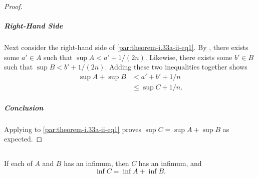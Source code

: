 \documentclass{report}
\begin{document}
\begin{proof}
    \subparagraph{Right-Hand Side}%

      Next consider the right-hand side of \eqref{par:theorem-i.33a-ii-eq1}.
      By , there exists some $a' \in A$ such that
        $\sup{A} < a' + 1 / (2n)$.
      Likewise, there exists some $b' \in B$ such that
        $\sup{B} < b' + 1 / (2n)$.
      Adding these two inequalities together shows
        \begin{align*}
          \sup{A} + \sup{B}
            & < a' + b' + 1 / n \\
            & \leq \sup{C} + 1 / n.
        \end{align*}

    \subparagraph{Conclusion}%

      Applying  to \eqref{par:theorem-i.33a-ii-eq1}
        proves $\sup{C} = \sup{A} + \sup{B}$ as expected.

\end{proof}

\subsection{}%
\label{sub:theorem-i.33b}

If each of $A$ and $B$ has an infimum, then $C$ has an infimum, and
  $$\inf{C} = \inf{A} + \inf{B}.$$
\end{document}
